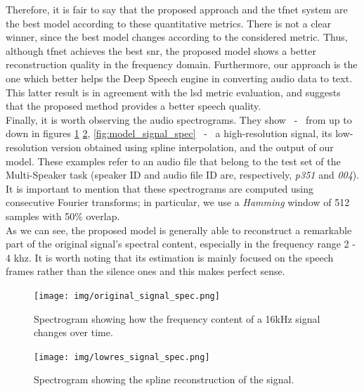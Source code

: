 \noindent Therefore, it is fair to say that the proposed approach and the \gls{tfnet} system are the best model according to these quantitative metrics. There is not a clear winner, since the best model changes according to the considered metric. Thus, although \gls{tfnet} achieves the best \gls{snr}, the proposed model shows a better reconstruction quality in the frequency domain. Furthermore, our approach is the one which better helps the Deep Speech engine in converting audio data to text. This latter result is in agreement with the \gls{lsd} metric evaluation, and suggests that the proposed method provides a better speech quality. \\
Finally, it is worth observing the audio spectrograms. They show ~-~ from up to down in figures \ref{fig:original_signal_spec} \ref{fig:lowres_signal_spec}, \ref{fig:model_signal_spec} ~-~ a high-resolution signal, its low-resolution version obtained using spline interpolation, and the output of our model. These examples refer to an audio file that belong to the test set of the Multi-Speaker task (speaker ID and audio file ID are, respectively, \textit{p351} and \textit{004}).\\
It is important to mention that these spectrograms are computed using consecutive Fourier transforms; in particular, we use a \textit{Hamming} window of 512 samples with 50\% overlap.\\
As we can see, the proposed model is generally able to reconstruct a remarkable part of the original signal’s spectral content, especially in the frequency range 2 - 4 k\gls{hz}. It is worth noting that its estimation is mainly focused on the speech frames rather than the silence ones and this makes perfect sense. 

\begin{figure}[!htb]
	\begin{center}
		\texttt{[image: img/original\_signal\_spec.png]}
		\caption{Spectrogram showing how the frequency content of a 16kHz signal changes over time.}
		\label{fig:original_signal_spec}
	\end{center}
\end{figure}

\begin{figure}[!htb]
	\begin{center}
		\texttt{[image: img/lowres\_signal\_spec.png]}
		\caption{Spectrogram showing the spline reconstruction of the signal.}
		\label{fig:lowres_signal_spec}
	\end{center}
\end{figure}

